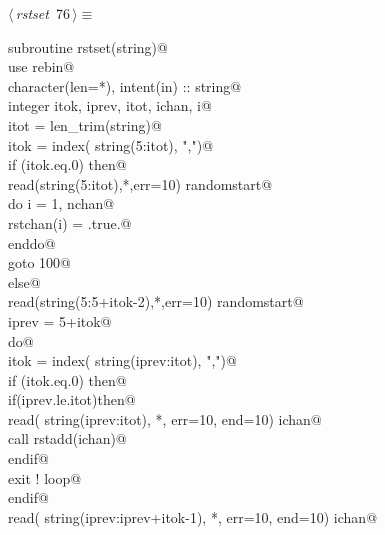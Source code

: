 \documentclass[10pt,a4paper,notitlepage]{article}
\begin{document}
\begin{flushleft} \small
\begin{minipage}{\linewidth}\label{scrap85}\raggedright\small
{} $\langle\,${\it rstset}\nobreak\ {\footnotesize {76}}$\,\rangle\equiv$
\vspace{-1ex}
\begin{list}{}{} \item
\mbox{}\verb@      subroutine rstset(string)@\\
\mbox{}\verb@      use rebin@\\
\mbox{}\verb@      character(len=*), intent(in) :: string@\\
\mbox{}\verb@      integer itok, iprev, itot, ichan, i@\\
\mbox{}\verb@      itot = len_trim(string)@\\
\mbox{}\verb@      itok = index( string(5:itot), ",")@\\
\mbox{}\verb@      if (itok.eq.0) then@\\
\mbox{}\verb@         read(string(5:itot),*,err=10) randomstart@\\
\mbox{}\verb@         do i = 1, nchan@\\
\mbox{}\verb@           rstchan(i) = .true.@\\
\mbox{}\verb@         enddo@\\
\mbox{}\verb@         goto 100@\\
\mbox{}\verb@      else@\\
\mbox{}\verb@         read(string(5:5+itok-2),*,err=10) randomstart@\\
\mbox{}\verb@         iprev = 5+itok@\\
\mbox{}\verb@         do@\\
\mbox{}\verb@            itok = index( string(iprev:itot), ",")@\\
\mbox{}\verb@            if (itok.eq.0) then@\\
\mbox{}\verb@               if(iprev.le.itot)then@\\
\mbox{}\verb@                  read( string(iprev:itot), *, err=10, end=10) ichan@\\
\mbox{}\verb@                  call rstadd(ichan)@\\
\mbox{}\verb@               endif@\\
\mbox{}\verb@               exit ! loop@\\
\mbox{}\verb@            endif@\\
\mbox{}\verb@            read( string(iprev:iprev+itok-1), *, err=10, end=10) ichan@\\

\end{list}
\end{minipage}
\end{flushleft}
\end{document}
